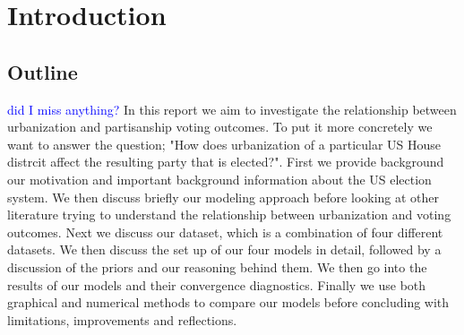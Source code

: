 \documentclass[12pt]{article}
\newcommand{\blue}[1]{\textcolor{blue}{#1}}
\begin{document}











\thispagestyle{empty} %
\newpage

\tableofcontents
\newpage


\section{Introduction}
 
\subsection*{Outline}
\blue{did I miss anything?}
In this report we aim to investigate the relationship between urbanization and partisanship voting outcomes. To put it more concretely we want to answer the question; "How does urbanization of a particular US House distrcit affect the resulting party that is elected?". First we provide background our motivation and important background information about the US election system. 
We then discuss briefly our modeling approach before looking at other literature trying to understand the relationship between urbanization and voting outcomes. 
Next we discuss our dataset, which is a combination of four different datasets. 
We then discuss the set up of our four models in detail, followed by a discussion of the priors and our reasoning behind them. We then go into the results of our models and their convergence diagnostics. Finally we use both graphical and numerical methods to compare our models before concluding with limitations, improvements and reflections. 
\end{document}
